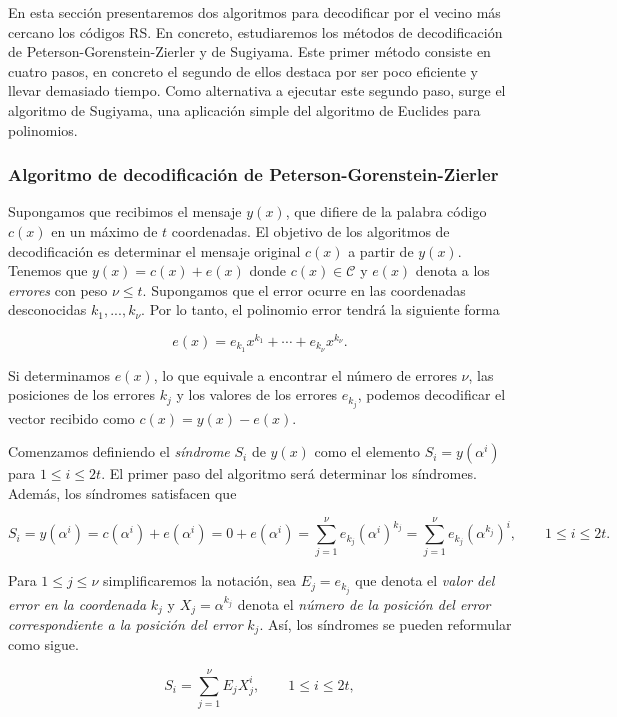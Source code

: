 En esta sección presentaremos dos algoritmos para decodificar por el vecino más cercano los códigos RS. En concreto, estudiaremos los métodos de decodificación de Peterson-Gorenstein-Zierler y de Sugiyama. Este primer método consiste en cuatro pasos, en concreto el segundo de ellos destaca por ser poco eficiente y llevar demasiado tiempo. Como alternativa a ejecutar este segundo paso, surge el algoritmo de Sugiyama, una aplicación simple del algoritmo de Euclides para polinomios.

\subsubsection{Algoritmo de decodificación de Peterson-Gorenstein-Zierler}

Supongamos que recibimos el mensaje $y(x)$, que difiere de la palabra código $c(x)$ en un máximo de $t$ coordenadas. El objetivo de los algoritmos de decodificación es determinar el mensaje original $c(x)$ a partir de $y(x)$. Tenemos que $y(x) = c(x) + e(x)$ donde $c(x) \in \mathcal{C}$ y $e(x)$ denota a los \emph{errores} con peso $\nu \leq t$. Supongamos que el error ocurre en las coordenadas desconocidas $k_1, ..., k_\nu$. Por lo tanto, el polinomio error tendrá la siguiente forma

$$e(x) = e_{k_1} x^{k_1} + \cdots + e_{k_{\nu}} x^{k_{\nu}}.$$

Si determinamos $e(x)$, lo que equivale a encontrar el número de errores $\nu$, las posiciones de los errores $k_j$ y los valores de los errores $e_{k_j}$, podemos decodificar el vector recibido como $c(x) = y(x) - e(x)$.

Comenzamos definiendo el \emph{síndrome} $S_i$ de $y(x)$ como el elemento $S_i = y \left( \alpha^i \right)$ para $1 \leq i \leq 2t$. El primer paso del algoritmo será determinar los síndromes. Además, los síndromes satisfacen que

$$S_i = y (\alpha^i) = c (\alpha^i) + e (\alpha^i) = 0 + e (\alpha^i) = \sum_{j=1}^{\nu} e_{k_j} (\alpha^i) ^{k_j} = \sum_{j=1}^{\nu} e_{k_j} (\alpha^{k_j}) ^i, \qquad 1 \leq i \leq 2t.$$

Para $1 \leq j \leq \nu$ simplificaremos la notación, sea $E_j = e_{k_j}$ que denota el \emph{valor del error en la coordenada} $k_j$ y $X_j = \alpha^{k_j}$ denota el \emph{número de la posición del error correspondiente a la posición del error} $k_j$. Así, los síndromes se pueden reformular como sigue.

\begin{equation}
    \label{prop:sindromes_peterson}
    S_i = \sum_{j=1}^{\nu} E_j X_j^i, \qquad 1 \leq i \leq 2t,
\end{equation}

